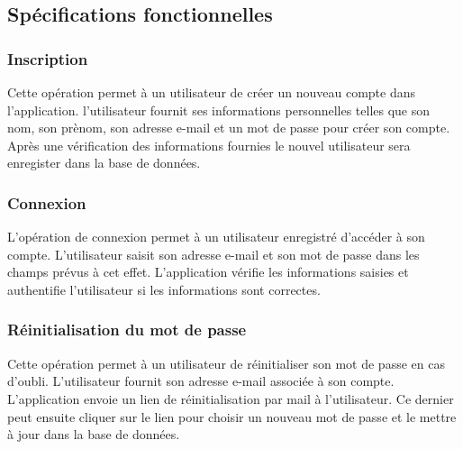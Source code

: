 \subsection{Spécifications fonctionnelles}
\subsubsection{Inscription}
Cette opération permet à un utilisateur de créer un nouveau compte dans l'application.
l'utilisateur fournit ses informations personnelles telles que son nom, son prènom, son adresse e-mail et un mot de passe pour créer son compte. Après une vérification des informations fournies le nouvel utilisateur sera enregister dans la  base de données.
\subsubsection{Connexion}
L'opération de connexion permet à un utilisateur enregistré d'accéder à son compte. L'utilisateur saisit son adresse e-mail et son mot de passe dans les champs prévus à cet effet. L'application vérifie les informations saisies et authentifie l'utilisateur si les informations sont correctes.
\subsubsection{Réinitialisation du mot de passe}
Cette opération permet à un utilisateur de réinitialiser son mot de passe en cas d'oubli. L'utilisateur fournit son adresse e-mail associée à son compte. L'application envoie un lien de réinitialisation par mail à l'utilisateur. Ce dernier peut ensuite cliquer sur le lien pour choisir un nouveau mot de passe et le mettre à jour dans la base de données.
